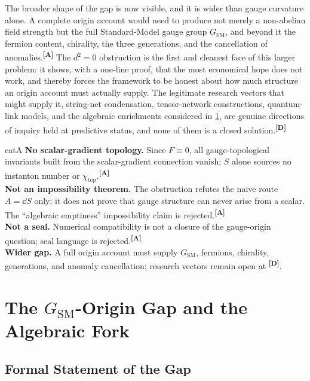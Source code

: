 \documentclass[12pt,a4paper,twoside]{article}
\theoremstyle{plain}
\theoremstyle{definition}
\theoremstyle{remark}
\newcommand{\catmark}[1]{\textsuperscript{\textsf{\textbf{[#1]}}}}
\begin{document}
The broader shape of the gap is now visible, and it is wider than gauge curvature alone. A complete origin account would need to produce not merely a non-abelian field strength but the full Standard-Model gauge group $G_{\mathrm{SM}}$, and beyond it the fermion content, chirality, the three generations, and the cancellation of anomalies.\catmark{A} The $d^2 = 0$ obstruction is the first and cleanest face of this larger problem: it shows, with a one-line proof, that the most economical hope does not work, and thereby forces the framework to be honest about how much structure an origin account must actually supply. The legitimate research vectors that might supply it, string-net condensation, tensor-network constructions, quantum-link models, and the algebraic enrichments considered in \cref{sec:algebraic-fork}, are genuine directions of inquiry held at predictive status, and none of them is a closed solution.\catmark{D}

\begin{evidencebox}{catA}
\textbf{No scalar-gradient topology.} Since $F \equiv 0$, all gauge-topological invariants built from the scalar-gradient connection vanish; $S$ alone sources no
instanton number or $\chi_{\mathrm{top}}$.\catmark{A}\\[0.3em]
\textbf{Not an impossibility theorem.} The obstruction refutes the naive route $A=\dd S$ only; it does not prove that gauge structure can never arise from a scalar. The ``algebraic emptiness'' impossibility claim is
rejected.\catmark{A}\\[0.3em]
\textbf{Not a seal.} Numerical compatibility is not a closure of the
gauge-origin question; seal language is rejected.\catmark{A}\\[0.3em]
\textbf{Wider gap.} A full origin account must supply $G_{\mathrm{SM}}$, fermions, chirality, generations, and anomaly cancellation; research vectors remain open at \catmark{D}.
\end{evidencebox}

\newpage
\section{The \texorpdfstring{$G_{\mathrm{SM}}$}{G_SM}-Origin Gap and the Algebraic Fork}
\label{sec:algebraic-fork}

\subsection{Formal Statement of the Gap}
\label{subsec:gsm-gap-statement}
\end{document}
